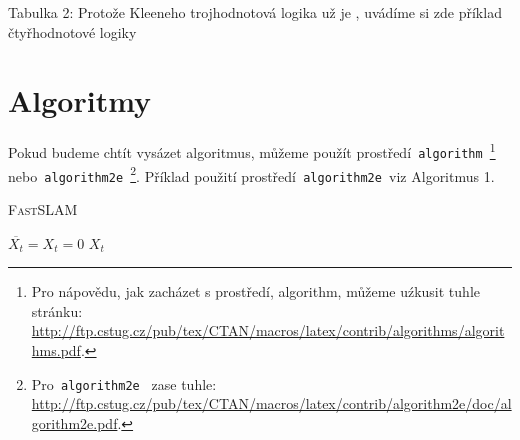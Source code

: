 \documentclass[a4paper, 11pt]{article}
\begin{document}
\noindent
Tabulka 2: Protože Kleeneho trojhodnotová logika už je , uvádíme si zde příklad čtyřhodnotové logiky\\

\bigskip
\pagebreak
\thispagestyle{plain}
\clearpage

\section{Algoritmy}
\noindent
Pokud budeme chtít vysázet algoritmus, můžeme použít prostředí\texttt{ algorithm }\footnote{ Pro nápovědu, jak zacházet s prostředí, algorithm, můžeme uźkusit tuhle stránku: \url{http://ftp.cstug.cz/pub/tex/CTAN/macros/latex/contrib/algorithms/algorithms.pdf}.}
nebo\texttt{ algorithm2e }\footnote{Pro\texttt{ algorithm2e } zase tuhle: \url{http://ftp.cstug.cz/pub/tex/CTAN/macros/latex/contrib/algorithm2e/doc/algorithm2e.pdf}. }.
Příklad použití prostředí\texttt{ algorithm2e }viz Algoritmus 1.\\

\smallskip
\begin{algorithm}[H]
\DontPrintSemicolon
\caption{\textsc{FastSLAM}}
\Indm	
\Indp
	$\overline{X_t} = X_t = 0$\;
	\Return $X_t$
\end{algorithm}

\bigskip
\end{document}
